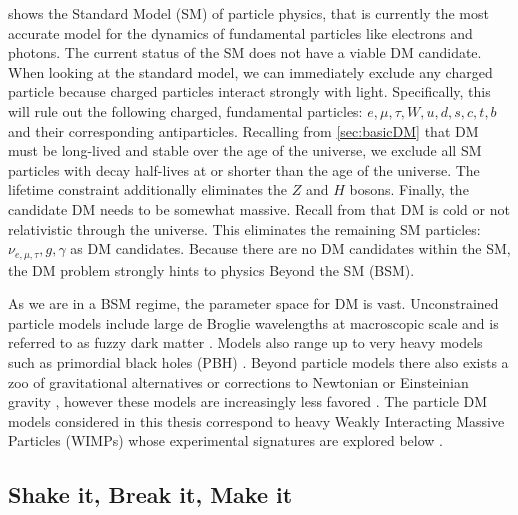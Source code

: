  shows the Standard Model (SM) of particle physics, that is currently the most accurate model for the dynamics of fundamental particles like electrons and photons.
The current status of the SM does not have a viable DM candidate.
When looking at the standard model, we can immediately exclude any charged particle because charged particles interact strongly with light.
Specifically, this will rule out the following charged, fundamental particles: $e,\mu, \tau, W, u, d, s, c, t, b$ and their corresponding antiparticles.
Recalling from \cref{sec:basicDM} that DM must be long-lived and stable over the age of the universe, we exclude all SM particles with decay half-lives at or shorter than the age of the universe.
The lifetime constraint additionally eliminates the $Z$ and $H$ bosons.
Finally, the candidate DM needs to be somewhat massive.
Recall from  that DM is cold or not relativistic through the universe.
This eliminates the remaining SM particles: $\nu_{e, \mu, \tau}, g, \gamma$ as DM candidates.
Because there are no DM candidates within the SM, the DM problem strongly hints to physics Beyond the SM (BSM).

As we are in a BSM regime, the parameter space for DM is vast.
Unconstrained particle models include large de Broglie wavelengths at macroscopic scale and is referred to as fuzzy dark matter \cite{les_houche:ALPs,dm_PDGID}.
Models also range up to very heavy models such as primordial black holes (PBH) \cite{les_houches:PBH}.
Beyond particle models there also exists a zoo of gravitational alternatives or corrections to Newtonian or Einsteinian gravity \cite{les_houche:MOND}, however these models are increasingly less favored \cite{dm_PDGID}.
The particle DM models considered in this thesis correspond to heavy Weakly Interacting Massive Particles (WIMPs) whose experimental signatures are explored below \cite{les_houche:WIMP,dm_PDGID}.

\subsection{Shake it, Break it, Make it\label{sec:bop_it}}


